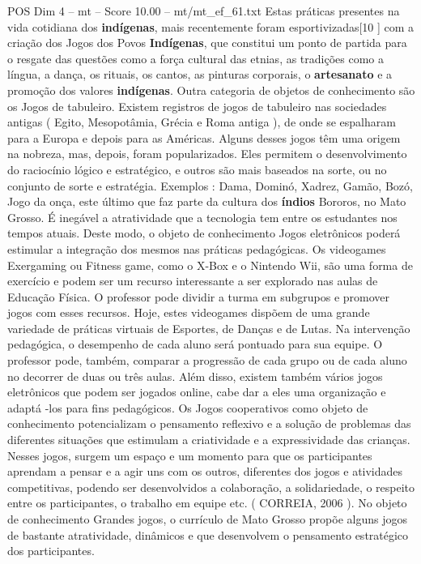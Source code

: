 \begin{textsample}{POS Dim 4 – mt – Score 10.00 – mt/mt\_ef\_61.txt}
Estas práticas presentes na vida cotidiana dos \textbf{indígenas}, mais recentemente foram esportivizadas[10 ] com a criação dos Jogos dos Povos \textbf{Indígenas}, que constitui um ponto de partida para o resgate das questões como a força cultural das etnias, as tradições como a língua, a dança, os rituais, os cantos, as pinturas corporais, o \textbf{artesanato} e a promoção dos valores \textbf{indígenas}.
Outra categoria de objetos de conhecimento são os Jogos de tabuleiro.
Existem registros de jogos de tabuleiro nas sociedades antigas ( Egito, Mesopotâmia, Grécia e Roma antiga ), de onde se espalharam para a Europa e depois para as Américas.
Alguns desses jogos têm uma origem na nobreza, mas, depois, foram popularizados.
Eles permitem o desenvolvimento do raciocínio lógico e estratégico, e outros são mais baseados na sorte, ou no conjunto de sorte e estratégia.
Exemplos : Dama, Dominó, Xadrez, Gamão, Bozó, Jogo da onça, este último que faz parte da cultura dos \textbf{índios} Bororos, no Mato Grosso.
É inegável a atratividade que a tecnologia tem entre os estudantes nos tempos atuais.
Deste modo, o objeto de conhecimento Jogos eletrônicos poderá estimular a integração dos mesmos nas práticas pedagógicas.
Os videogames Exergaming ou Fitness game, como o X-Box e o Nintendo Wii, são uma forma de exercício e podem ser um recurso interessante a ser explorado nas aulas de Educação Física.
O professor pode dividir a turma em subgrupos e promover jogos com esses recursos.
Hoje, estes videogames dispõem de uma grande variedade de práticas virtuais de Esportes, de Danças e de Lutas.
Na intervenção pedagógica, o desempenho de cada aluno será pontuado para sua equipe.
O professor pode, também, comparar a progressão de cada grupo ou de cada aluno no decorrer de duas ou três aulas.
Além disso, existem também vários jogos eletrônicos que podem ser jogados online, cabe dar a eles uma organização e adaptá -los para fins pedagógicos.
Os Jogos cooperativos como objeto de conhecimento potencializam o pensamento reflexivo e a solução de problemas das diferentes situações que estimulam a criatividade e a expressividade das crianças.
Nesses jogos, surgem um espaço e um momento para que os participantes aprendam a pensar e a agir uns com os outros, diferentes dos jogos e atividades competitivas, podendo ser desenvolvidos a colaboração, a solidariedade, o respeito entre os participantes, o trabalho em equipe etc. ( CORREIA, 2006 ).
No objeto de conhecimento Grandes jogos, o currículo de Mato Grosso propõe alguns jogos de bastante atratividade, dinâmicos e que desenvolvem o pensamento estratégico dos participantes.

\end{textsample}
